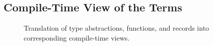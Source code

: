 \subsection{Compile-Time View of the Terms}
\label{sct:compile-views}
\begin{figure*}
\begin{multicols}{2}[]

    {\Pi \tsv {}}

    {\Pi \tsv {}}

\end{multicols}
\vspace{10pt}

\begin{multicols}{2}[]
    {\Pi \tsv {}}

    {\Pi \tsv {}}
\end{multicols}
\vspace{10pt}
\begin{multicols}{2}[]
    {\Pi \tsv {}}
    {\Pi \tsv {}}
\end{multicols}
\vspace{10pt}

\begin{multicols}{2}[]
    {\Pi \tsv {}}

    {\Pi \tsv {}}
\end{multicols}
\vspace{10pt}

    {\Pi \tsv {}}

\caption{Translation of type abstractions, functions, and records into corresponding
 compile-time views.}
\label{fig:ct-translation}
\end{figure*}
